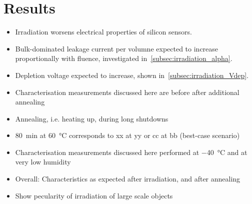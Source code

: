 \section{Results}
\label{sec:results}

\begin{itemize}
	\item Irradiation worsens electrical properties of silicon sensors.
	\item Bulk-dominated leakage current per volumne expected to increase proportionally with fluence, investigated in~\ref{subsec:irradiation_alpha}.
	\item Depletion voltage expected to increase, shown in~\ref{subsec:irradiation_Vdep}.		
	\item Characterisation measurements discussed here are before after additional annealing
	\item Annealing, i.e. heating up, during long shutdowns
	\item \SI{80}{\minute} at \SI{60}{\celsius} corresponds to xx at yy or cc at bb (best-case scenario)
	\item Characterisation measurements discussed here performed at \SI{-40}{\celsius} and at very low humidity
	\item Overall: Characteristics as expected after irradiation, and after annealing
	\item Show pecularity of irradiation of large scale objects
\end{itemize}

